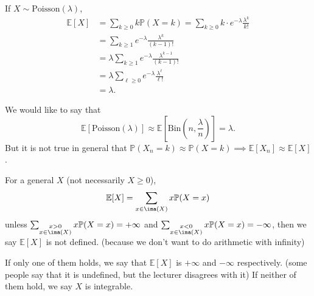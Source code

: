 \begin{example}
    If \(X \sim \mathrm{Poisson}(\lambda)\),
    \begin{align*}
        \mathbb{E}[X] &= \sum_{k \geq 0} k \mathbb{P}(X = k) = \sum_{k \geq 0} k \cdot e^{-\lambda}\frac{\lambda^k}{k!}\\
        &= \sum_{k \geq 1} e^{-\lambda}\frac{\lambda^k}{(k - 1)!}\\
        &= \lambda \sum_{k \geq 1} e^{-\lambda}\frac{\lambda^{k - 1}}{(k - 1)!}\\
        &= \lambda \sum_{\ell \geq 0} e^{-\lambda} \frac{\lambda^{\ell}}{\ell!}\\
        &= \lambda.
    \end{align*}
    \begin{note}
        We would like to say that
        \[
            \mathbb{E}[\mathrm{Poisson} (\lambda)] \approx \mathbb{E}[\mathrm{Bin}(n, \frac{\lambda}{n})] = \lambda.
        \]
        But it is not true in general that \(\mathbb{P}(X_n = k) \approx \mathbb{P}(X = k) \implies \mathbb{E}[X_n] \approx \mathbb{E}[X]\).
    \end{note}
\end{example}
For a general \(X\) (not necessarily \(X \geq 0\)),
\[
    \mathbb{E}[X] = \sum_{x \in \ima(X)} x \mathbb{P}(X = x)
\]
unless \(\sum_{\substack{x > 0\\ x \in \ima(X)}}x \mathbb{P}(X = x) = + \infty\) and \(\sum_{\substack{x < 0\\ x \in \ima(X)}}x \mathbb{P}(X = x) = - \infty\), then we say \(\mathbb{E}[X]\) is not defined. (because we don't want to do arithmetic with infinity)

If only one of them holds, we say that \(\mathbb{E}[X]\) is \(+ \infty\) and \(- \infty\) respectively. (some people say that it is undefined, but the lecturer disagrees with it) If neither of them hold, we say \(X\) is integrable.

